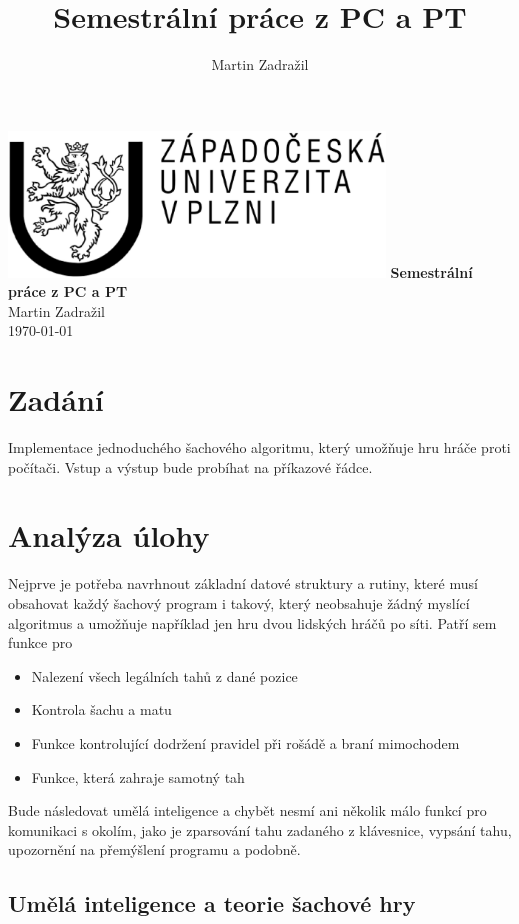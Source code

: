 \documentclass[11pt, titlepage]{article}
\author{Martin Zadražil}
\title{Semestrální práce z PC a PT}
\begin{document}
\begin{titlepage}
	\begin{center}
		\includegraphics[width=10cm]{zculogo.ps}
		\vskip 5cm
		{\huge \bfseries Semestrální práce z PC a PT} \\
		\vskip 1cm
		{ \large Martin Zadražil} \\
		{ \large \today }
	\end{center}
\end{titlepage}

\tableofcontents
\newpage

\section{Zadání}

Implementace jednoduchého šachového algoritmu, který umožňuje hru hráče proti počítači. Vstup a výstup bude probíhat na příkazové řádce.

\section{Analýza úlohy}

Nejprve je potřeba navrhnout základní datové struktury a rutiny, které musí obsahovat každý šachový program i takový, který neobsahuje žádný myslící algoritmus a umožňuje například jen hru dvou lidských hráčů po síti. Patří sem funkce pro
\begin{itemize}
	\item Nalezení všech legálních tahů z dané pozice
	\item Kontrola šachu a matu
	\item Funkce kontrolující dodržení pravidel při rošádě a braní mimochodem
	\item Funkce, která zahraje samotný tah
\end{itemize}
Bude následovat umělá inteligence a chybět nesmí ani několik málo funkcí pro komunikaci s okolím, jako je zparsování tahu zadaného z klávesnice, vypsání tahu, upozornění na přemýšlení programu a podobně.

\subsection{Umělá inteligence a teorie šachové hry}
\end{document}
